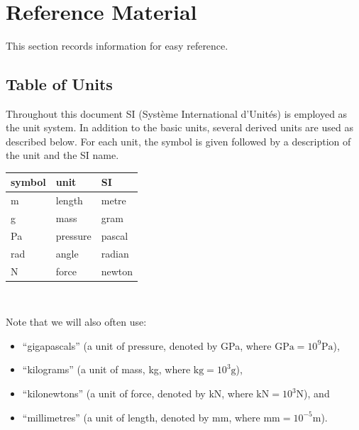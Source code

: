 \documentclass[12pt]{article}
\begin{document}
~\newpage


\section{Reference Material}

This section records information for easy reference.

\subsection{Table of Units}

Throughout this document SI (Syst\`{e}me International d'Unit\'{e}s) is employed
as the unit system.  In addition to the basic units, several derived units are
used as described below.  For each unit, the symbol is given followed by a
description of the unit and the SI name. ~\newline

\begin{center}
    \renewcommand{\arraystretch}{1.2}
    \noindent \begin{tabular}{l l l}
        \toprule
        \textbf{symbol} & \textbf{unit} & \textbf{SI} \\
        \midrule
        \si{\metre}     & length        & metre       \\
        \si{\gram}      & mass          & gram        \\
        \si{\pascal}    & pressure      & pascal      \\
        \si{\radian}    & angle         & radian      \\
        \si{\newton}    & force         & newton      \\
        \bottomrule
    \end{tabular}\\
\end{center}

\noindent{}Note that we will also often use:

\begin{itemize}

    \item ``gigapascals'' (a unit of pressure, denoted by \si{\giga\pascal},
          where \(\si{\giga\pascal}=10^{9}\si{\pascal}\)),

    \item ``kilograms'' (a unit of mass, \si{\kilogram}, where
          \(\si{\kilogram}=10^{3}\si{\gram}\)),

    \item ``kilonewtons'' (a unit of force, denoted by \si{\kilo\newton}, where
          \(\si{\kilo\newton}=10^{3}\si{\newton}\)), and

    \item ``millimetres'' (a unit of length, denoted by \si{\milli\metre}, where
          \(\si{\milli\metre}=10^{-5}\si{\metre}\)).

\end{itemize}
\end{document}
